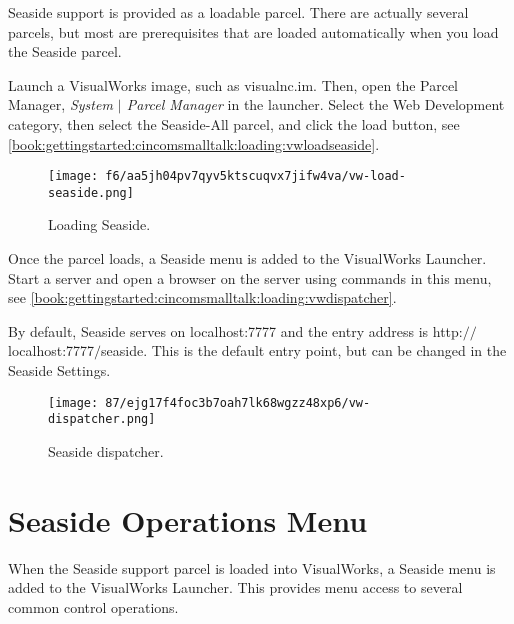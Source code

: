 \documentclass[a4paper,10pt,twoside]{book}
\newcommand{\ct}[1]{{\small\ttfamily\textup{#1}}}
\begin{document}
Seaside support is provided as a loadable parcel. There are actually several parcels, but most are prerequisites that are loaded automatically when you load the Seaside parcel.

Launch a VisualWorks image, such as visualnc.im. Then, open the Parcel Manager, \textit{System $|$ Parcel Manager} in the launcher. Select the Web Development category, then select the Seaside-All parcel, and click the load button, see \autoref{book:gettingstarted:cincomsmalltalk:loading:vwloadseaside}.

\begin{figure}[h!tbp]
	\begin{center}
		\texttt{[image: f6/aa5jh04pv7qyv5ktscuqvx7jifw4va/vw-load-seaside.png]}
		\caption{Loading Seaside.\label{book:gettingstarted:cincomsmalltalk:loading:vwloadseaside}}
	\end{center}
\end{figure}


Once the parcel loads, a Seaside menu is added to the VisualWorks Launcher. Start a server and open a browser on the server using commands in this menu, see \autoref{book:gettingstarted:cincomsmalltalk:loading:vwdispatcher}. 

By default, Seaside serves on \ct{localhost:7777} and the entry address is \ct{http:$/$$/$localhost:7777$/$seaside}. This is the default entry point, but can be changed in the Seaside Settings.

\begin{figure}[h!tbp]
	\begin{center}
		\texttt{[image: 87/ejg17f4foc3b7oah7lk68wgzz48xp6/vw-dispatcher.png]}
		\caption{Seaside dispatcher.\label{book:gettingstarted:cincomsmalltalk:loading:vwdispatcher}}
	\end{center}
\end{figure}


\section{Seaside Operations Menu}
\label{book:gettingstarted:cincomsmalltalk:menu}

When the Seaside support parcel is loaded into VisualWorks, a Seaside menu is added to the VisualWorks Launcher. This provides menu access to several common control operations.
\end{document}
